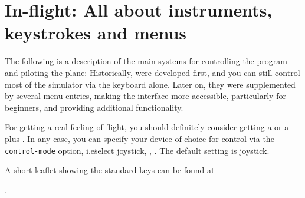 
\chapter{In-flight: All about instruments, keystrokes and menus\label{flight}}

The following is a description of the main systems for controlling the
program and piloting the plane: Historically,  were
developed
first, and you can still control most of the simulator via the keyboard alone.
Later on,
they were supplemented by several menu entries, making the interface more
accessible,
particularly for beginners, and providing additional functionality. 

For getting a real feeling of flight, you should definitely consider
getting a  or a  plus
. In any case, you can specify your device of
choice for control via the \texttt{-$ $-control-mode} option, i.e\.
select joystick, , . The default setting
is joystick. 

A short leaflet showing the standard keys can be found at
 \medskip

.
 \medskip

